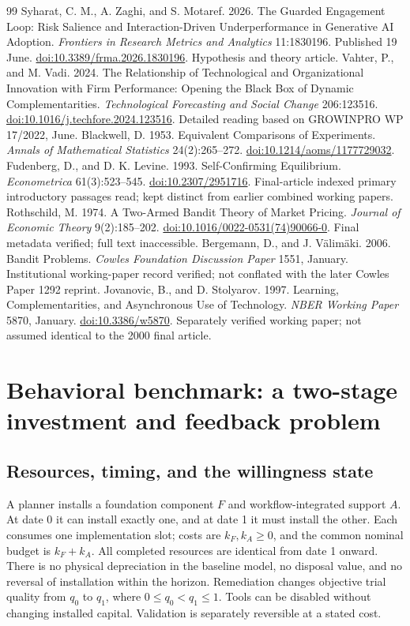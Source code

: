 \documentclass[11pt]{article}
\begin{document}
{\begin{thebibliography}{99}
 Syharat, C. M., A. Zaghi, and S. Motaref. 2026. The Guarded Engagement Loop: Risk Salience and Interaction-Driven Underperformance in Generative AI Adoption. \emph{Frontiers in Research Metrics and Analytics} 11:1830196. Published 19 June. \href{https://doi.org/10.3389/frma.2026.1830196}{doi:10.3389/frma.2026.1830196}. Hypothesis and theory article.
 Vahter, P., and M. Vadi. 2024. The Relationship of Technological and Organizational Innovation with Firm Performance: Opening the Black Box of Dynamic Complementarities. \emph{Technological Forecasting and Social Change} 206:123516. \href{https://doi.org/10.1016/j.techfore.2024.123516}{doi:10.1016/j.techfore.2024.123516}. Detailed reading based on GROWINPRO WP 17/2022, June.
 Blackwell, D. 1953. Equivalent Comparisons of Experiments. \emph{Annals of Mathematical Statistics} 24(2):265--272. \href{https://doi.org/10.1214/aoms/1177729032}{doi:10.1214/aoms/1177729032}.
 Fudenberg, D., and D. K. Levine. 1993. Self-Confirming Equilibrium. \emph{Econometrica} 61(3):523--545. \href{https://doi.org/10.2307/2951716}{doi:10.2307/2951716}. Final-article indexed primary introductory passages read; kept distinct from earlier combined working papers.
 Rothschild, M. 1974. A Two-Armed Bandit Theory of Market Pricing. \emph{Journal of Economic Theory} 9(2):185--202. \href{https://doi.org/10.1016/0022-0531(74)90066-0}{doi:10.1016/0022-0531(74)90066-0}. Final metadata verified; full text inaccessible.
 Bergemann, D., and J. V\"alim\"aki. 2006. Bandit Problems. \emph{Cowles Foundation Discussion Paper} 1551, January. Institutional working-paper record verified; not conflated with the later Cowles Paper 1292 reprint.
 Jovanovic, B., and D. Stolyarov. 1997. Learning, Complementarities, and Asynchronous Use of Technology. \emph{NBER Working Paper} 5870, January. \href{https://doi.org/10.3386/w5870}{doi:10.3386/w5870}. Separately verified working paper; not assumed identical to the 2000 final article.
\end{thebibliography}

}
\clearpage
\appendix
\section{Behavioral benchmark: a two-stage investment and feedback problem}\label{app:behavior}
\subsection{Resources, timing, and the willingness state}
A planner installs a foundation component $F$ and workflow-integrated support $A$. At date 0 it can install exactly one, and at date 1 it must install the other. Each consumes one implementation slot; costs are $k_F,k_A\geq0$, and the common nominal budget is $k_F+k_A$. All completed resources are identical from date 1 onward. There is no physical depreciation in the baseline model, no disposal value, and no reversal of installation within the horizon. Remediation changes objective trial quality from $q_0$ to $q_1$, where $0\leq q_0<q_1\leq1$. Tools can be disabled without changing installed capital. Validation is separately reversible at a stated cost.
\end{document}
